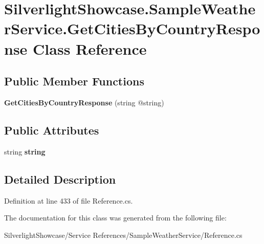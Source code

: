 \hypertarget{class_silverlight_showcase_1_1_sample_weather_service_1_1_get_cities_by_country_response}{
\section{SilverlightShowcase.SampleWeatherService.GetCitiesByCountryResponse Class Reference}
\label{class_silverlight_showcase_1_1_sample_weather_service_1_1_get_cities_by_country_response}
}
\subsection*{Public Member Functions}
\begin{DoxyCompactItemize}
\item 
\hypertarget{class_silverlight_showcase_1_1_sample_weather_service_1_1_get_cities_by_country_response_a964f06265bda2bb47f0538808fce399f}{
{\bfseries GetCitiesByCountryResponse} (string @string)}
\label{class_silverlight_showcase_1_1_sample_weather_service_1_1_get_cities_by_country_response_a964f06265bda2bb47f0538808fce399f}

\end{DoxyCompactItemize}
\subsection*{Public Attributes}
\begin{DoxyCompactItemize}
\item 
\hypertarget{class_silverlight_showcase_1_1_sample_weather_service_1_1_get_cities_by_country_response_ac1c59c4949e485a71ad348ad7f3d1521}{
string {\bfseries string}}
\label{class_silverlight_showcase_1_1_sample_weather_service_1_1_get_cities_by_country_response_ac1c59c4949e485a71ad348ad7f3d1521}

\end{DoxyCompactItemize}


\subsection{Detailed Description}


Definition at line 433 of file Reference.cs.

The documentation for this class was generated from the following file:\begin{DoxyCompactItemize}
\item 
SilverlightShowcase/Service References/SampleWeatherService/Reference.cs\end{DoxyCompactItemize}
